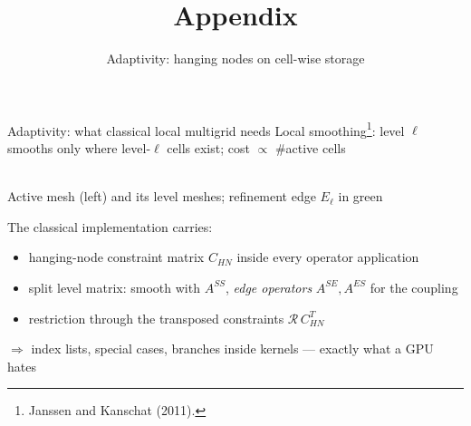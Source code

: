 \documentclass{beamer}
\begin{document}
\appendix

{
    \title{Appendix}
    \subtitle{Adaptivity: hanging nodes on cell-wise storage}
    \begin{frame}
        \titlepage
    \end{frame}
}


\begin{frame}{Adaptivity: what classical local multigrid needs}
    \small
    Local smoothing\footnote{Janssen and Kanschat (2011).}: level $\ell$ smooths only where level-$\ell$ cells exist;
    cost $\propto$ \#active cells
    \begin{center}
        \resizebox{0.62\textwidth}{!}{}\\
        {\scriptsize Active mesh (left) and its level meshes; refinement edge $E_\ell$ in green}
    \end{center}
    The classical implementation carries:
    \begin{itemize}
        \item hanging-node constraint matrix $C_{HN}$ inside every operator application
        \item split level matrix: smooth with $A^{SS}$, \emph{edge operators} $A^{SE}, A^{ES}$ for the coupling
        \item restriction through the transposed constraints $\mathcal R\, C_{HN}^T$
    \end{itemize}
    $\Rightarrow$ index lists, special cases, branches inside kernels \alert{--- exactly what a GPU hates}
\end{frame}
\end{document}
